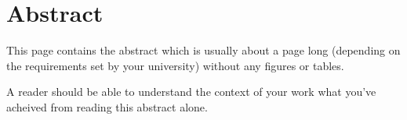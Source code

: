\chapter*{\centering Abstract}
{}

This page contains the abstract which is usually about a page long (depending on the requirements set by your university) without any figures or tables.
\par
A reader should be able to understand the context of your work what you've acheived from reading this abstract alone.
